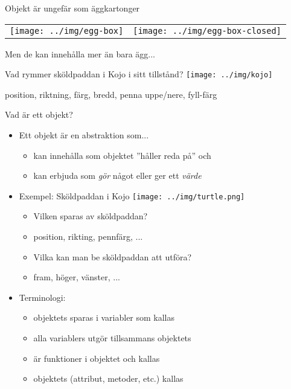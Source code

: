 

\ifkompendium\else
\begin{SlideExtra}{Objekt är ungefär som äggkartonger}
  \begin{tabular}{l r}
    \texttt{[image: ../img/egg-box]}
    &
    \texttt{[image: ../img/egg-box-closed]}
  \end{tabular}
  Men de kan innehålla mer än bara ägg...
\end{SlideExtra}
\fi

\begin{Slide}{Vad rymmer sköldpaddan i Kojo i sitt tillstånd?}
\centering
\texttt{[image: ../img/kojo]}

\pause position, riktning, färg, bredd, penna uppe/nere, fyll-färg
\end{Slide}



\begin{Slide}{Vad är ett objekt?}
\begin{itemize}
\item Ett objekt är en abstraktion som...
\begin{itemize}
  \item kan innehålla  som objektet ''håller reda på'' och
  \item kan erbjuda  som \emph{gör} något eller ger ett \emph{värde}
\end{itemize}

\pause

\item Exempel: Sköldpaddan i Kojo \texttt{[image: ../img/turtle.png]}
\begin{itemize}
  \item Vilken  sparas av sköldpaddan?
  \pause
  \item[] position, rikting, pennfärg, ...

  \item Vilka  kan man be sköldpaddan att utföra?

  \item[] fram, höger, vänster, ...
  \pause


\end{itemize}

\item Terminologi:
\begin{itemize}
  \item objektets  sparas i variabler som kallas 
  \item alla variablers  utgör tillsammans objektets 
  \item {} är funktioner i objektet och kallas 
  \item objektets  (attribut, metoder, etc.) kallas 
\end{itemize}
\end{itemize}
\end{Slide}



